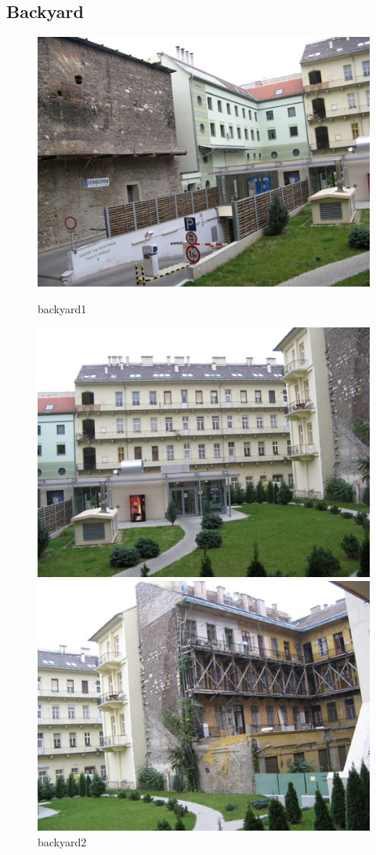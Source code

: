 \documentclass[12pt,a4paper]{report}
\begin{document}
\subsection*{Backyard}
\begin{figure}[!htb]
  \includegraphics[width=\linewidth]{backyard1}
    \caption{backyard1}
\endminipage\hfill
{}
  \includegraphics[width=\linewidth]{backyard2}
    \caption{backyard2}
\endminipage\hfill
{}%
  \includegraphics[width=\linewidth]{backyard3}

\end{figure}
\end{document}
